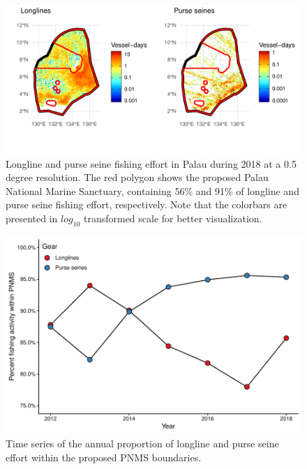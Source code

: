 \documentclass[12pt]{article}
\begin{document}
\begin{figure}
\centering
\includegraphics{img/plw_2018.pdf}
\caption{\label{fig:plw_2018}Longline and purse seine fishing effort in Palau during 2018 at a 0.5 degree resolution. The red polygon shows the proposed Palau National Marine Sanctuary, containing 56\% and 91\% of longline and purse seine fishing effort, respectively. Note that the colorbars are presented in $log_{10}$ transformed scale for better visualization.}
\end{figure}

\begin{figure}
\centering
\includegraphics{img/plw_ts_plot.pdf}
\caption{\label{fig:plw_ts_plot}Time series of the annual proportion of longline and purse seine effort within the proposed PNMS boundaries.}
\end{figure}

\clearpage



\end{document}
